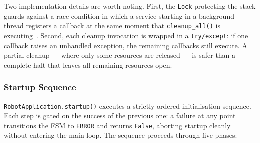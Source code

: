 Two implementation details are worth noting. First, the \texttt{Lock}
protecting the stack guards against a race condition in which a
service starting in a background thread registers a callback at the
same moment that \texttt{cleanup\_all()} is
executing~\cite{silberschatz2018os}. Second, each cleanup invocation
is wrapped in a \texttt{try/except}: if one callback raises an
unhandled exception, the remaining callbacks still execute. A partial
cleanup — where only some resources are released — is safer than a
complete halt that leaves all remaining resources open.

\subsubsection{Startup Sequence}
\label{sec:startup_seq}

\texttt{RobotApplication.startup()} executes a strictly ordered
initialisation sequence. Each step is gated on the success of the
previous one: a failure at any point transitions the FSM to
\texttt{ERROR} and returns \texttt{False}, aborting startup cleanly
without entering the main loop. The sequence proceeds through five
phases:

